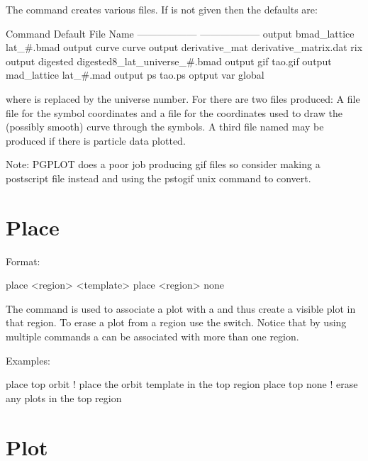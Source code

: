 \vskip 0.2in The  command creates various files. If  is
not given then the defaults are:
\begin{example}
  Command                         Default File Name
  ------------------              ------------------
  output bmad_lattice             lat_#.bmad
  output curve                    curve
  output derivative_mat           derivative_matrix.dat rix               
  output digested                 digested8_lat_universe_#.bmad
  output gif                      tao.gif
  output mad_lattice              lat_#.mad
  output ps                       tao.ps
  optput var                      global%
\end{example}
where \vn{\#} is replaced by the universe number. For  there are two files produced: A file
 file for the symbol coordinates and a
 file for the coordinates used to draw the
(possibly smooth) curve through the symbols. A third file named
 may be produced if there is particle
data plotted.

Note: PGPLOT does a poor job producing gif files so consider
making a postscript file instead and using the pstogif unix command to
convert.

\section{Place}
\label{s:place}

Format:
\begin{example}
  place <region> <template>
  place <region> none
\end{example}

\vskip 0.2in 
The  command is used to associate a  plot
with a  and thus create a visible plot in that region. To
erase a plot from a region use the  switch. Notice that by
using multiple  commands a  can be associated
with more than one region.

Examples:
\begin{example}
  place top orbit  ! place the orbit template in the top region
  place top none   ! erase any plots in the top region
\end{example}

\section{Plot}
\label{s:plot}

